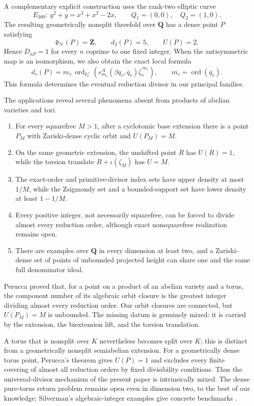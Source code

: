 \documentclass[11pt,letterpaper,reqno]{amsart}
\theoremstyle{definition}
\theoremstyle{remark}
\newcommand{\Q}{\mathbf Q}
\newcommand{\Z}{\mathbf Z}
\newcommand{\ord}{\operatorname{ord}}
\newcommand{\Ner}{\mathcal N}
\begin{document}
A complementary explicit construction uses the rank-two elliptic curve
\[
 E_{389}:\ y^2+y=x^3+x^2-2x,
 \qquad Q_1=(0,0),\quad Q_2=(1,0).
\]
The resulting geometrically nonsplit threefold over $\Q$ has a dense point
$P$ satisfying
\[
 \mathfrak d_{\Ner}(P)=\Z,
 \qquad d_2(P)=5,
 \qquad U(P)=2.
\]
Hence $D_{nP}=1$ for every $n$ coprime to one fixed integer.  When the
antisymmetric map is an isomorphism, we also obtain the exact local formula
\[
 d_v(P)=m_v\,
 \ord_{k_v^\times}\!\left(
 e_{m_v}^A(\beta\overline q_v,\overline q_v)
 \overline\zeta_v^{\,m_v}
 \right),
 \qquad m_v=\ord(\overline q_v).
\]
This formula determines the eventual reduction divisor in our principal
families.

The applications reveal several phenomena absent from products of abelian
varieties and tori.
\begin{enumerate}[label=\textup{(\alph*)}]
\item For every squarefree $M>1$, after a cyclotomic base extension there is a
      point $P_M$ with Zariski-dense cyclic orbit and $U(P_M)=M$.
\item On the same geometric extension, the unshifted point $R$ has $U(R)=1$,
      while the torsion translate $R+\iota(\zeta_M)$ has $U=M$.
\item The exact-order and primitive-divisor index sets have upper density at
      most $1/M$, while the Zsigmondy set and a bounded-support set have lower
      density at least $1-1/M$.
\item Every positive integer, not necessarily squarefree, can be forced to
      divide almost every reduction order, although exact nonsquarefree
      realization remains open.
\item There are examples over $\Q$ in every dimension at least two, and a
      Zariski-dense set of points of unbounded projected height can share one
      and the same full denominator ideal.
\end{enumerate}
Perucca \cite{Perucca2009} proved that, for a point on a product of an abelian variety and a torus,
the component number of its algebraic orbit closure is the greatest integer
dividing almost every reduction order.  Our orbit closures
are connected, but $U(P_M)=M$ is unbounded.  The missing datum is genuinely
mixed: it is carried by the extension, the biextension lift, and the torsion
translation.

A torus that is nonsplit over $K$ nevertheless becomes split over
$\overline K$; this is distinct from a geometrically nonsplit semiabelian
extension.  For a geometrically dense torus point, Perucca's theorem gives
$U(P)=1$ and excludes every finite covering of almost all reduction orders by
fixed divisibility conditions.  Thus the universal-divisor mechanism of the
present paper is intrinsically mixed.  The dense pure-torus return problem
remains open even in dimension two, to the best of our knowledge; Silverman's
algebraic-integer examples give concrete benchmarks
\cite{Silverman2006AlgebraicIntegers}.
\end{document}
